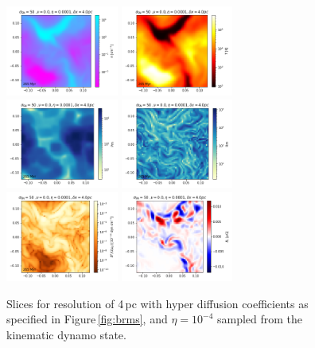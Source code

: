 \documentclass[iop,apj,numberedappendix,twocolappendix]{emulateapj}
\begin{document}
\begin{figure}
\centering
\includegraphics[trim=0.0cm 0.00cm 0.0cm 0.0cm,clip=true,width=0.33\textwidth]{csc_figs/rho4pcPm0e-4_032.png}
\includegraphics[trim=0.0cm 0.00cm 0.0cm 0.0cm,clip=true,width=0.33\textwidth]{csc_figs/tt4pcPm0e-4_032.png}
\includegraphics[trim=0.0cm 0.00cm 0.0cm 0.0cm,clip=true,width=0.33\textwidth]{csc_figs/Pm4pcPm0e-4_032.png}
\includegraphics[trim=0.0cm 0.00cm 0.0cm 0.0cm,clip=true,width=0.33\textwidth]{csc_figs/Rm4pcPm0e-4_032.png}
\includegraphics[trim=0.0cm 0.00cm 0.0cm 0.0cm,clip=true,width=0.33\textwidth]{csc_figs/pb4pcPm0e-4_032.png}
\includegraphics[trim=0.0cm 0.00cm 0.0cm 0.0cm,clip=true,width=0.33\textwidth]{csc_figs/bb14pcPm0e-4_032.png}
\caption{
Slices for resolution of 4\,pc with hyper diffusion coefficients as 
specified in Figure\,\ref{fig:brms}, and $\eta=10^{-4}$ sampled from the 
kinematic dynamo state.
\label{fig:4pcUB}
}
\end{figure}
\end{document}
